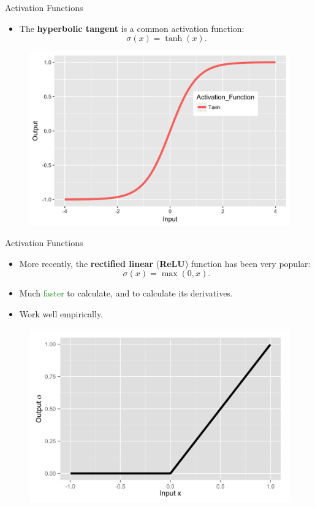 \documentclass[usenames,dvipsnames,notes,11pt,aspectratio=169,hyperref={colorlinks=true, linkcolor=blue}]{beamer}
\begin{document}
\begin{frame}{Activation Functions}

\begin{itemize}
\item The \textbf{hyperbolic tangent} is a common activation function:
\[
\sigma(x)=\tanh\left(x\right).
\]
\end{itemize}
\begin{figure}
\includegraphics[height=0.55\textheight]{figures/activationFn-Tanh}
\end{figure}
\end{frame}
%
\begin{frame}{Activation Functions}
\begin{itemize}
\item More recently, the \textbf{rectified linear} (\textbf{ReLU}) function has been very
popular:
\[
\sigma(x)=\max(0,x).
\]
\item Much \textcolor{Green}{faster} to calculate, and to calculate
its derivatives.
\item Work well empirically.
\end{itemize}
\begin{figure}
\includegraphics[height=0.55\textheight]{figures/activationFn-Rectified_Linear} 
\end{figure}
\end{frame}
\end{document}
